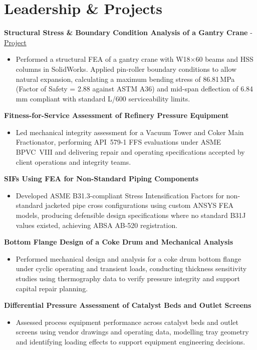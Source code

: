 \documentclass[10pt, letterpaper]{article}
\newcommand{\projhead}[1]{\vspace{5pt}\textbf{#1}\par\vspace{1pt}}
\newcommand{\projheadlink}[3]{\vspace{5pt}\textbf{#1} - \href{#3}{\textcolor{linkblue}{\underline{#2}}}\par\vspace{1pt}}
\begin{document}
\section*{Leadership \& Projects}

\projheadlink{Structural Stress \& Boundary Condition Analysis of a Gantry Crane}{Project}{https://www.linkedin.com/posts/jaykumar-prajapati_mechanicalengineering-finiteelementanalysis-activity-7481037256577912833-8sKD}
\begin{itemize}
  \item Performed a structural FEA of a gantry crane with W18$\times$60 beams and HSS columns in SolidWorks. Applied pin-roller boundary conditions to allow natural expansion, calculating a maximum bending stress of 86.81\,MPa (Factor of Safety = 2.88 against ASTM A36) and mid-span deflection of 6.84\,mm compliant with standard L/600 serviceability limits.
\end{itemize}

\projhead{Fitness-for-Service Assessment of Refinery Pressure Equipment}
\begin{itemize}
  \item Led mechanical integrity assessment for a Vacuum Tower and Coker Main Fractionator, performing API~579-1 FFS evaluations under ASME BPVC~VIII and delivering repair and operating specifications accepted by client operations and integrity teams.
\end{itemize}

\projhead{SIFs Using FEA for Non-Standard Piping Components}
\begin{itemize}
  \item Developed ASME B31.3-compliant Stress Intensification Factors for non-standard jacketed pipe cross configurations using custom ANSYS FEA models, producing defensible design specifications where no standard B31J values existed, achieving ABSA AB-520 registration.
\end{itemize}

\projhead{Bottom Flange Design of a Coke Drum and Mechanical Analysis}
\begin{itemize}
  \item Performed mechanical design and analysis for a coke drum bottom flange under cyclic operating and transient loads, conducting thickness sensitivity studies using thermography data to verify pressure integrity and support capital repair planning.
\end{itemize}

\projhead{Differential Pressure Assessment of Catalyst Beds and Outlet Screens}
\begin{itemize}
  \item Assessed process equipment performance across catalyst beds and outlet screens using vendor drawings and operating data, modelling tray geometry and identifying loading effects to support equipment engineering decisions.
\end{itemize}
\end{document}
